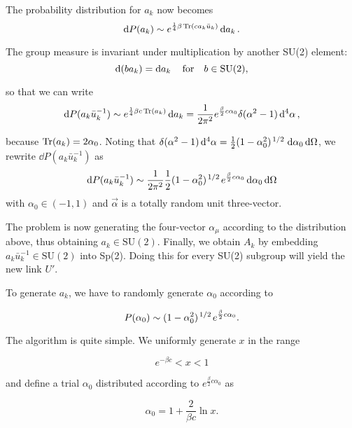 \documentclass[reqno,12pt]{article}
\numberwithin{equation}{section}
\newcommand{\SU}{\mathrm{SU}}
\begin{document}
The probability distribution for $a_k$ now becomes
\begin{equation}
	\dd{P(a_k)} \sim e^{\frac{1}{4}\beta\Tr(c a_k \bar{u}_k)} \dd{a_k}.
\end{equation}

The group measure is invariant under multiplication by another SU(2) element:
\begin{equation}
	\dd(b a_k) = \dd{a_k} \qfor b \in \SU(2),
\end{equation}

so that we can write
\begin{equation}
	\dd{P(a_k \bar{u}_k^{-1})} \sim e^{\frac{1}{4}\beta c \Tr(a_k)} \dd{a_k} 
	= \frac{1}{2\pi^2} e^{\frac{\beta}{2}c \alpha_0} \delta(\alpha^2 - 1) \dd[4]{\alpha},
\end{equation}

because $\Tr(a_k) = 2\alpha_0$. Noting that $\delta(\alpha^2 - 1)\dd[4]{\alpha} = 
\frac{1}{2}(1 - \alpha_0^2)^{\flatfrac{1}{2}} \dd{\alpha_0}\dd{\Omega}$, we rewrite $\dd{P(a_k \bar{u}_k^{-1})}$ as
\begin{equation}
	\dd{P(a_k \bar{u}_k^{-1})} \sim 
	\frac{1}{2\pi^2} \frac{1}{2}(1 - \alpha_0^2)^{\flatfrac{1}{2}} e^{\frac{\beta}{2}c \alpha_0} \dd{\alpha_0}\dd{\Omega}
\end{equation}
with $\alpha_0 \in (-1,1)$ and $\vec{\alpha}$ is a totally random unit three-vector.

The problem is now generating the four-vector $\alpha_\mu$ according to the distribution above, thus obtaining
$a_k \in \SU(2)$. Finally, we obtain $A_k$ by embedding $a_k \bar{u}_k^{-1} \in \SU(2)$ into Sp(2). Doing this for every 
SU(2) subgroup will yield the new link $U'$.

To generate $a_k$, we have to randomly generate $\alpha_0$ according to

\begin{equation} \label{eq:probdistalpha}
	P(\alpha_0) \sim (1 - \alpha_0^2)^{\flatfrac{1}{2}} e^{\frac{\beta}{2}c\alpha_0}.
\end{equation}

The algorithm is quite simple. We uniformly generate $x$ in the range 

\begin{equation}
	e^{-\beta c} < x < 1
\end{equation} 

and define a trial $\alpha_0$ distributed according to $e^{\frac{\beta}{2}c\alpha_0}$ as

\begin{equation}
	\alpha_0 = 1 + \frac{2}{\beta c}\ln{x}.
\end{equation}
\end{document}
